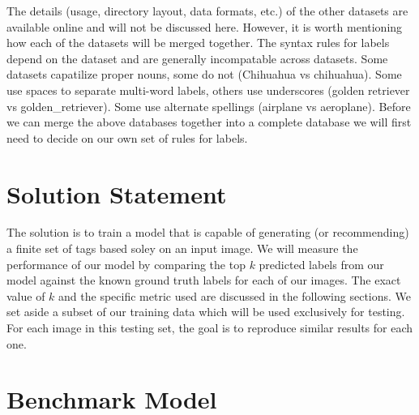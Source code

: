 \documentclass[10pt, a4paper, twocolumn]{article} %
\begin{document}
The details (usage, directory layout, data formats, etc.) of the other datasets are available online and will not be discussed here.  However, it is worth mentioning how each of the datasets will be merged together. The syntax rules for labels depend on the dataset and are generally incompatable across datasets.  Some datasets capatilize proper nouns, some do not (Chihuahua vs chihuahua). Some use spaces to separate multi-word labels, others use underscores (golden retriever vs golden\_retriever). Some use alternate spellings (airplane vs aeroplane).  Before we can merge the above databases together into a complete database we will first need to decide on our own set of rules for labels.

\section{Solution Statement} %



The solution is to train a model that is capable of generating (or recommending) a finite set of tags based soley on an input image.  We will measure the performance of our model by comparing the top $k$ predicted labels from our model against the known ground truth labels for each of our images.  The exact value of $k$ and the specific metric used are discussed in the following sections. We set aside a subset of our training data which will be used exclusively for testing. For each image in this testing set, the goal is to reproduce similar results for each one.

\section{Benchmark Model} %
\end{document}
